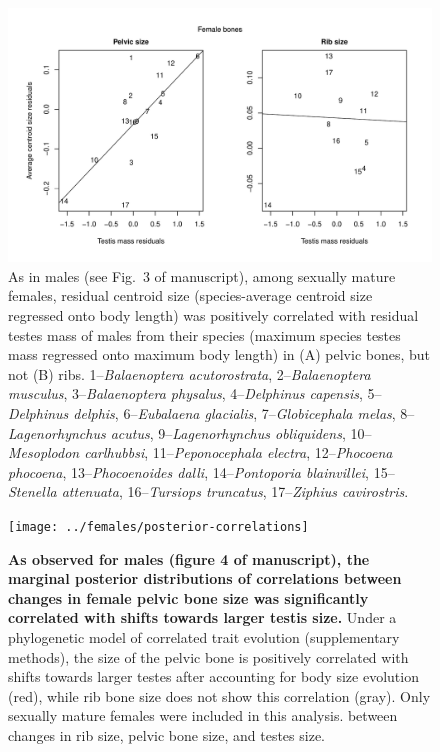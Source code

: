 \documentclass[12pt]{article}
\begin{document}
\begin{figure}[ht]
  \begin{center}
    \includegraphics[width=\textwidth]{S8}
  \end{center}
  \caption{
  As in males (see Fig.\ 3 of manuscript), among sexually mature females, residual centroid size (species-average centroid size regressed onto body length) was positively correlated with residual testes mass of males from their species (maximum species testes mass regressed onto maximum body length) in (A) pelvic bones, but not (B) ribs. 1--\textit{Balaenoptera acutorostrata}, 2--\textit{Balaenoptera musculus}, 3--\textit{Balaenoptera physalus}, 4--\textit{Delphinus capensis}, 5--\textit{Delphinus delphis}, 6--\textit{Eubalaena glacialis}, 7--\textit{Globicephala melas}, 8--\textit{Lagenorhynchus acutus}, 9--\textit{Lagenorhynchus obliquidens}, 10--\textit{Mesoplodon carlhubbsi}, 11--\textit{Peponocephala electra}, 12--\textit{Phocoena phocoena}, 13--\textit{Phocoenoides dalli}, 14--\textit{Pontoporia blainvillei}, 15--\textit{Stenella attenuata}, 16--\textit{Tursiops truncatus}, 17--\textit{Ziphius cavirostris}.
  }
\end{figure}


\begin{figure}[ht]
  \begin{center}
    \texttt{[image: ../females/posterior-correlations]}
  \end{center}
  \caption{
  \textbf{As observed for males (figure 4 of manuscript), the marginal posterior
distributions of correlations between changes in female pelvic bone size was significantly
correlated with shifts towards larger testis size.} Under a phylogenetic model of correlated trait
evolution (supplementary methods), the size of the pelvic bone is positively correlated with shifts
towards larger testes after accounting for body size evolution (red), while rib bone size does not show
this correlation (gray). Only sexually mature females were included in this analysis.
  between changes in rib size, pelvic bone size, and testes size.
  \label{fig:female_posterior_cors}
  }
\end{figure}
\end{document}
